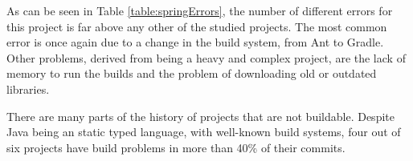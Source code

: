 As can be seen in Table \ref{table:springErrors}, the number of different errors for this project is far above any other of the studied projects.
The most common error is once again due to a change in the build system, from Ant to Gradle.
Other problems, derived from being a heavy and complex project, are the lack of memory to run the builds and the problem of downloading old or outdated libraries.

\vspace{0.3cm}
\begin{tcolorbox}[fonttitle=\bfseries,title=Answer to RQ1: Can we build all snapshots of a project?,label=rq1,colframe=blue!50!black]
	There are many parts of the history of projects that are not buildable.
	Despite Java being an static typed language, with well-known build systems, four out of six projects have build problems in more than 40\% of their commits.
\end{tcolorbox}









